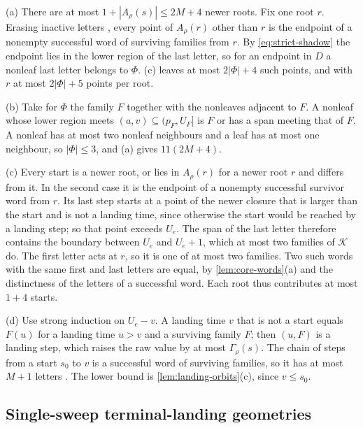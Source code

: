 \begin{outline}
(a) There are at most $1+|A_\rho(s)|\le2M+4$ newer roots. Fix one root $r$. Erasing
inactive letters \cite[Lemma~2.6]{SourceCovers2026}, every point of $A_\rho(r)$ other
than $r$ is the endpoint of a nonempty successful word of surviving families from $r$.
By \eqref{eq:strict-shadow} the endpoint lies in the lower region of the last letter,
so for an endpoint in $D$ a nonleaf last letter belongs to $\Phi$.
(c) leaves at most $2|\Phi|+4$ such points, and with $r$ at most
$2|\Phi|+5$ points per root.

(b) Take for $\Phi$ the family $F$ together with the nonleaves adjacent to $F$. A
nonleaf whose lower region meets $(a,v)\subseteq(p_F,U_F]$ is $F$ or has a span
meeting that of $F$. A nonleaf has at most two nonleaf neighbours and a leaf has at
most one neighbour, so $|\Phi|\le3$, and (a) gives $11(2M+4)$.

(c) Every start is a newer root, or lies in $A_\rho(r)$ for a newer root $r$ and
differs from it. In the second case it is the endpoint of a nonempty successful
survivor word from $r$. Its last step starts at a point of the newer closure that is
larger than the start and is not a landing time, since otherwise the start would be
reached by a landing step; so that point exceeds $U_e$. The span of the last letter
therefore contains the boundary between $U_e$ and $U_e+1$, which at most two families
of $\mathcal K$ do. The first letter acts at $r$, so it is one of at most two
families. Two such words with the same first and last letters are equal, by
\cref{lem:core-words}(a) and the distinctness of the letters of a successful word.
Each root thus contributes at most $1+4$ starts.

(d) Use strong induction on $U_e-v$. A landing time $v$ that is not a start equals
$F(u)$ for a landing time $u>v$ and a surviving family $F$; then $(u,F)$ is a landing
step, which raises the raw value by at most $\Gamma_\rho(s)$. The chain of steps from
a start $s_0$ to $v$ is a successful word of surviving families, so it has at most
$M+1$ letters \cite[Lemma~2.6]{SourceCovers2026}. The lower bound is
\cref{lem:landing-orbits}(c), since $v\le s_0$.
\end{outline}

\subsection{Single-sweep terminal-landing geometries}

